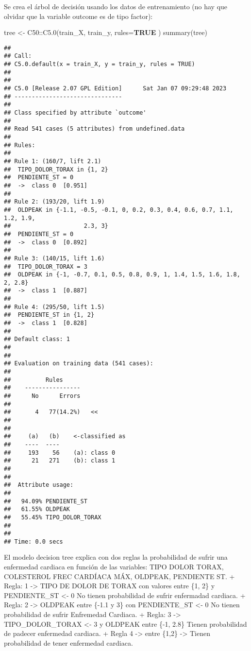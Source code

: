 \documentclass[
]{article}
\newenvironment{Shaded}{\begin{snugshade}}{\end{snugshade}}
\newcommand{\AttributeTok}[1]{\textcolor[rgb]{0.80,0.80,0.80}{#1}}
\newcommand{\ConstantTok}[1]{\textcolor[rgb]{0.86,0.64,0.64}{\textbf{#1}}}
\newcommand{\FunctionTok}[1]{\textcolor[rgb]{0.94,0.94,0.56}{#1}}
\newcommand{\NormalTok}[1]{\textcolor[rgb]{0.80,0.80,0.80}{#1}}
\newcommand{\OtherTok}[1]{\textcolor[rgb]{0.94,0.94,0.56}{#1}}
\newcommand{\SpecialCharTok}[1]{\textcolor[rgb]{0.86,0.64,0.64}{#1}}
\begin{document}
Se crea el árbol de decisión usando los datos de entrenamiento (no hay
que olvidar que la variable outcome es de tipo factor):

\begin{Shaded}
\begin{Highlighting}[]
\NormalTok{tree }\OtherTok{\textless{}{-}}\NormalTok{ C50}\SpecialCharTok{::}\FunctionTok{C5.0}\NormalTok{(train\_X, train\_y, }\AttributeTok{rules=}\ConstantTok{TRUE}\NormalTok{ )}
\FunctionTok{summary}\NormalTok{(tree)}
\end{Highlighting}
\end{Shaded}

\begin{verbatim}
## 
## Call:
## C5.0.default(x = train_X, y = train_y, rules = TRUE)
## 
## 
## C5.0 [Release 2.07 GPL Edition]      Sat Jan 07 09:29:48 2023
## -------------------------------
## 
## Class specified by attribute `outcome'
## 
## Read 541 cases (5 attributes) from undefined.data
## 
## Rules:
## 
## Rule 1: (160/7, lift 2.1)
##  TIPO_DOLOR_TORAX in {1, 2}
##  PENDIENTE_ST = 0
##  ->  class 0  [0.951]
## 
## Rule 2: (193/20, lift 1.9)
##  OLDPEAK in {-1.1, -0.5, -0.1, 0, 0.2, 0.3, 0.4, 0.6, 0.7, 1.1, 1.2, 1.9,
##                     2.3, 3}
##  PENDIENTE_ST = 0
##  ->  class 0  [0.892]
## 
## Rule 3: (140/15, lift 1.6)
##  TIPO_DOLOR_TORAX = 3
##  OLDPEAK in {-1, -0.7, 0.1, 0.5, 0.8, 0.9, 1, 1.4, 1.5, 1.6, 1.8, 2, 2.8}
##  ->  class 1  [0.887]
## 
## Rule 4: (295/50, lift 1.5)
##  PENDIENTE_ST in {1, 2}
##  ->  class 1  [0.828]
## 
## Default class: 1
## 
## 
## Evaluation on training data (541 cases):
## 
##          Rules     
##    ----------------
##      No      Errors
## 
##       4   77(14.2%)   <<
## 
## 
##     (a)   (b)    <-classified as
##    ----  ----
##     193    56    (a): class 0
##      21   271    (b): class 1
## 
## 
##  Attribute usage:
## 
##   94.09% PENDIENTE_ST
##   61.55% OLDPEAK
##   55.45% TIPO_DOLOR_TORAX
## 
## 
## Time: 0.0 secs
\end{verbatim}

El modelo decision tree explica con dos reglas la probabilidad de sufrir
una enfermedad cardiaca en función de las variables: TIPO DOLOR TORAX,
COLESTEROL FREC CARDÍACA MÁX, OLDPEAK, PENDIENTE ST. + Regla: 1
-\textgreater{} TIPO DE DOLOR DE TORAX con valores entre \{1, 2\} y
PENDIENTE\_ST \textless- 0 No tienen probabilidad de sufrir enfermadad
cardiaca. + Regla: 2 -\textgreater{} OLDPEAK entre \{-1.1 y 3\} con
PENDIENTE\_ST \textless- 0 No tienen probabilidad de sufrir Enfremedad
Cardiaca. + Regla: 3 -\textgreater{} TIPO\_DOLOR\_TORAX \textless- 3 y
OLDPEAK entre \{-1, 2.8\} Tienen probabilidad de padecer enfermedad
cardiaca. + Regla 4 -\textgreater{} entre \{1,2\} -\textgreater{} Tienen
probabilidad de tener enfermedad cardiaca.
\end{document}
